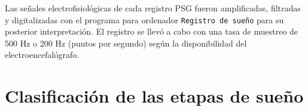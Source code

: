 

Las se\~nales electrofisiol\'ogicas de cada registro PSG fueron amplificadas, filtradas y 
digitalizadas con el programa para ordenador \texttt{Registro de sue\~no} 
para su posterior interpretaci\'on. 
El registro se llev\'o a cabo con una tasa de muestreo de 500 Hz o 200 Hz (puntos por segundo)
seg\'un la disponibilidad del electroencefal\'ografo.


\section{Clasificaci\'on de las etapas de sue\~no}

